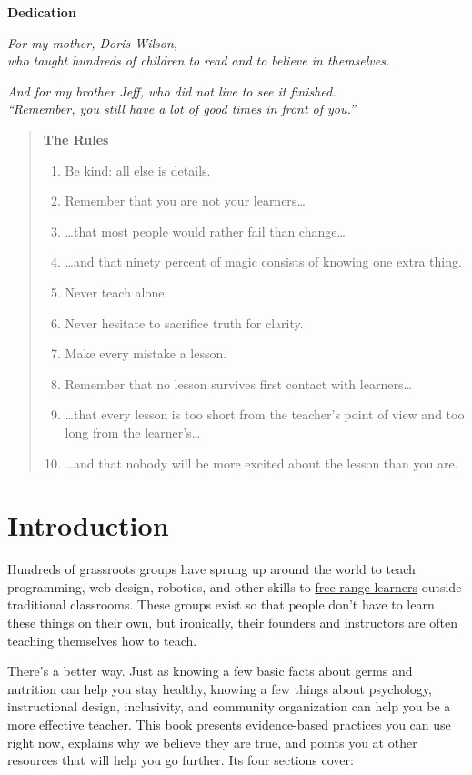 \textbf{Dedication}

\emph{For my mother, Doris Wilson,}\\
\emph{who taught hundreds of children to read and to believe in themselves.}

\emph{And for my brother Jeff, who did not live to see it finished.}\\
\emph{``Remember, you still have a lot of good times in front of you.''}

\begin{quote}\setlength{\parindent}{0pt}
\textbf{The Rules}

\begin{enumerate}
\item
  Be kind: all else is details.
\item
  Remember that you are not your learners\ldots{}
\item
  \ldots{}that most people would rather fail than change\ldots{}
\item
  \ldots{}and that ninety percent of magic consists of knowing one extra thing.
\item
  Never teach alone.
\item
  Never hesitate to sacrifice truth for clarity.
\item
  Make every mistake a lesson.
\item
  Remember that no lesson survives first contact with learners\ldots{}
\item
  \ldots{}that every lesson is too short from the teacher's point of view and too long from the learner's\ldots{}
\item
  \ldots{}and that nobody will be more excited about the lesson than you are.
\end{enumerate}
\end{quote}

\chapter{Introduction}\label{s:intro}

Hundreds of grassroots groups have sprung up around the world to teach
programming, web design, robotics, and other skills to \protect\hyperlink{g:free-range-learner}{free-range
learners} outside traditional classrooms. These
groups exist so that people don't have to learn these things on their
own, but ironically, their founders and instructors are often teaching
themselves how to teach.

There's a better way. Just as knowing a few basic facts about germs and
nutrition can help you stay healthy, knowing a few things about
psychology, instructional design, inclusivity, and community
organization can help you be a more effective teacher. This book
presents evidence-based practices you can use right now, explains why we
believe they are true, and points you at other resources that will help
you go further. Its four sections cover:

